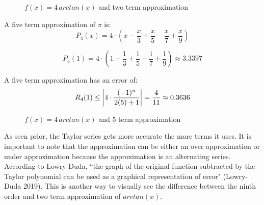 \documentclass[12pt, titlepage]{article}
\begin{document}
\begin{figure}[H]
\centering
	\caption[]{\(f(x) = 4 \,arctan(x)\) and two term approximation}
\end{figure}

A five term approximation of \(\pi\) is:
\begin{equation*}
	P_{4}(x) = 4 \cdot (x - \frac{x}{3} + \frac{x}{5} - \frac{x}{7} + \frac{x}{9}) 
\end{equation*}

\begin{equation*}
	P_{4}(1) = 4 \cdot (1 - \frac{1}{3} + \frac{1}{5} - \frac{1}{7} + \frac{1}{9}) \approx 3.3397
\end{equation*}

A five term approximation has an error of: 
\begin{equation*}
	R_{4}(1) \leq  \abs{4 \cdot {\frac{(-1)^n}{2(5)+1}}} = \frac{4}{11} \approx 0.3636
\end{equation*}

\begin{figure}[H]
\centering
	\caption[]{\(f(x) = 4 \,arctan(x)\) and 5 term approximation}
\end{figure}

As seen prior, the Taylor series gets more accurate the more terms it uses. It is important to note that the approximation can be either an over approximation or under approximation because the approximation is an alternating series. According to Lowry-Duda, ``the graph of the original function subtracted by the Taylor polynomial can be used as a graphical representation of error" (Lowry-Duda 2019). This is another way to visually see the difference between the ninth order and two term approximation of \(arctan(x)\). 
\end{document}
